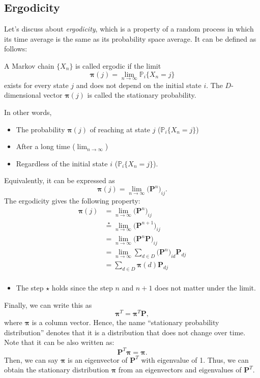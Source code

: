 \subsection{Ergodicity}

Let's discuss about \textit{ergodicity}, which is a property of a random process in which its time average is the same as its probability space average. It can be defined as follows:

\begin{definition}
A Markov chain $\{X_n\}$ is called ergodic if the limit
$$\boldsymbol{\pi} (j) = \lim_{n\to \infty}\mathbb{P}_i\{X_n=j\}$$
exists for every state $j$ and does not depend on the initial state $i$. The $D$-dimensional vector $\boldsymbol{\pi}(j)$ is called the stationary probability. 
\end{definition}
In other words, 
\begin{itemize}
	\item The probability $\boldsymbol{\pi}(j)$ of reaching at state $j$ (\ie $\mathbb{P}_i\{X_n=j\}$) 
	\item After a long time (\ie $\lim_{n\to\infty}$) 
	\item Regardless of the initial state $i$ (\ie $\mathbb{P}_i\{X_n=j\}$).
\end{itemize}
 Equivalently, it can be expressed as 
$$\boldsymbol{\pi}(j) = \lim_{n\to \infty}\big(\mathbf{P}^n\big)_{ij}.$$
The ergodicity gives the following property:
\begin{align*}
	\boldsymbol{\pi}(j) &= \lim_{n\to \infty}\big(\mathbf{P}^n\big)_{ij}\\ 
						&\overset{\star}{=} \lim_{n\to \infty}\big(\mathbf{P}^{n+1}\big)_{ij} \\
						&= \lim_{n\to \infty}\big(\mathbf{P}^{n}\mathbf{P}\big)_{ij} \\
						&= \lim_{n\to \infty}\sum_{d\in D}\big(\mathbf{P}^{n}\big)_{id}\mathbf{P}_{dj} \\
						&= \sum_{d\in D}\boldsymbol{\pi}(d)\mathbf{P}_{dj} \\
\end{align*}
\begin{itemize}
	\item The step $\star$ holds since the step $n$ and $n+1$ does not matter under the limit. 
\end{itemize}
Finally, we can write this as
$$\boldsymbol{\pi}^T = \boldsymbol{\pi}^T\mathbf{P},$$
where $\boldsymbol{\pi}$ is a column vector. Hence, the name ``stationary probability distribution'' denotes that it is a distribution that does not change over time. Note that it can be also written as:
$$\mathbf{P}^T\boldsymbol{\pi} = \boldsymbol{\pi}.$$
Then, we can say $\boldsymbol{\pi}$ is an eigenvector of $\mathbf{P}^T$ with eigenvalue of 1. Thus, we can obtain the stationary distribution $\boldsymbol{\pi}$ from an eigenvectors and eigenvalues of $\mathbf{P}^T$.


